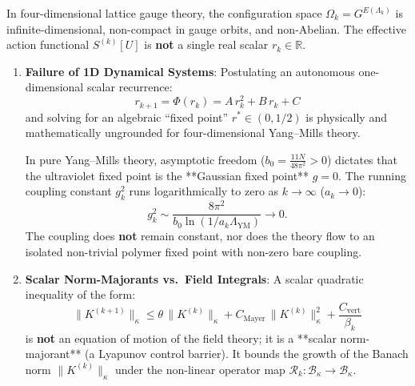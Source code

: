 \begin{warning}
\label{warn:scalar_recurrence_fallacy}
In four-dimensional lattice gauge theory, the configuration space $\Omega_k = G^{E(\Lambda_k)}$ is infinite-dimensional, non-compact in gauge orbits, and non-Abelian. The effective action functional $S^{(k)}[U]$ is \textbf{not} a single real scalar $r_k \in \mathbb{R}$.

\begin{enumerate}
    \item \textbf{Failure of 1D Dynamical Systems}:
    Postulating an autonomous one-dimensional scalar recurrence:
    \begin{equation}
    \label{eq:ch14_naive_1d_map}
    r_{k+1} = \Phi(r_k) = A \, r_k^2 + B \, r_k + C
    \end{equation}
    and solving for an algebraic ``fixed point'' $r^* \in (0, 1/2)$ is physically and mathematically ungrounded for four-dimensional Yang--Mills theory. 
    
    In pure Yang--Mills theory, asymptotic freedom ($b_0 = \frac{11 N}{48\pi^2} > 0$) dictates that the ultraviolet fixed point is the **Gaussian fixed point** $g = 0$. The running coupling constant $g_k^2$ runs logarithmically to zero as $k \to \infty$ ($a_k \to 0$):
    \begin{equation}
    g_k^2 \sim \frac{8\pi^2}{b_0 \ln(1 / a_k \Lambda_{\mathrm{YM}})} \to 0.
    \end{equation}
    The coupling does \textbf{not} remain constant, nor does the theory flow to an isolated non-trivial polymer fixed point with non-zero bare coupling.
    
    \item \textbf{Scalar Norm-Majorants vs.\ Field Integrals}:
    A scalar quadratic inequality of the form:
    \begin{equation}
    \label{eq:scalar_majorant_general}
    \|K^{(k+1)}\|_\kappa \le \theta \, \|K^{(k)}\|_\kappa + C_{\mathrm{Mayer}} \, \|K^{(k)}\|_\kappa^2 + \frac{C_{\mathrm{vert}}}{\beta_k}
    \end{equation}
    is \textbf{not} an equation of motion of the field theory; it is a **scalar norm-majorant** (a Lyapunov control barrier). It bounds the growth of the Banach norm $\|K^{(k)}\|_\kappa$ under the non-linear operator map $\mathcal{R}_k : \mathcal{B}_\kappa \to \mathcal{B}_\kappa$.
    

\end{enumerate}
\end{warning}
